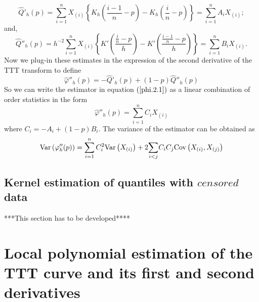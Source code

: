 \documentclass[preprint,12pt]{elsarticle}
\begin{document}
\begin{equation}\label{kernel.dQ}
\widehat{Q}'_h(p)=\sum_{i=1}^n X_{(i)}\left\{K_h\left(\frac{i-1}{n}-p\right)-K_h\left(\frac{i}{n}-p\right)\right\}=\sum_{i=1}^n A_iX_{(i)};
\end{equation}
and,
\begin{equation}\label{kernel.d2Q}
\widehat{Q}''_h(p)=h^{-2}\sum_{i=1}^n X_{(i)}\left\{K'\left(\frac{\frac{i}{n}-p}{h}\right)-K'\left(\frac{\frac{i-1}{n}-p}{h}\right)\right\}=\sum_{i=1}^n B_iX_{(i)}.
\end{equation}
Now we plug-in these estimates in the expression of the second derivative of the TTT transform to define
\begin{equation}\label{phi.2.1}
\widehat{\varphi}''_h(p)=-\widehat{Q}'_h(p)+(1-p)\widehat{Q}''_h(p)
\end{equation}
So we can write the estimator in equation $(\ref{phi.2.1})$ as a linear combination of order statistics in the form
\begin{equation}\label{phi.2.2}
\widehat{\varphi}''_h(p)=\sum_{i=1}^n C_iX_{(i)}
\end{equation}
where $C_i=-A_i+(1-p)B_i$.
The variance of the estimator can be obtained as
\begin{equation}\label{var.phi}
{\rm Var}\left(\varphi''_h(p)\right)=\sum_{i=1}^nC_i^2 {\rm Var}\left(X_{(i)}\right)+2\underset{i<j}{\sum}C_iC_j{\rm Cov}\left(X_{(i)},X_{(j)}\right)
\end{equation}



\subsection{Kernel estimation of quantiles with $censored$ data}
***This section has to be developed****

\newpage
%
\section{Local polynomial estimation of the TTT curve and its first and second derivatives}
\end{document}
